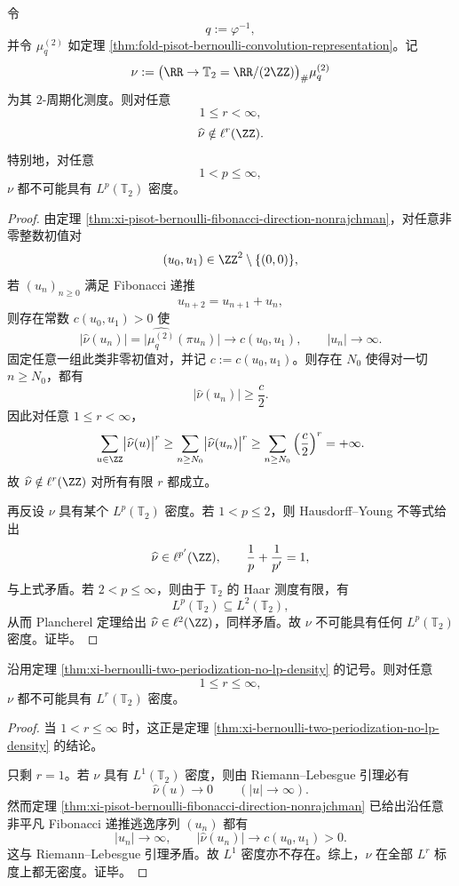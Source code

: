 \begin{theorem}\label{thm:xi-bernoulli-two-periodization-no-lp-density}
令
\[
q:=\varphi^{-1},
\]
并令 \(\mu_q^{(2)}\) 如定理 \ref{thm:fold-pisot-bernoulli-convolution-representation}。记
\[
\nu:=\bigl(\RR\to \mathbb T_2=\RR/(2\ZZ)\bigr)_\#\mu_q^{(2)}
\]
为其 \(2\)-周期化测度。则对任意
\[
1\le r<\infty,
\]
\[
\widehat\nu\notin \ell^r(\ZZ).
\]
特别地，对任意
\[
1<p\le\infty,
\]
\(\nu\) 都不可能具有 \(L^p(\mathbb T_2)\) 密度。
\end{theorem}
\begin{proof}
由定理 \ref{thm:xi-pisot-bernoulli-fibonacci-direction-nonrajchman}，对任意非零整数初值对
\[
(u_0,u_1)\in\ZZ^2\setminus\{(0,0)\},
\]
若 \((u_n)_{n\ge 0}\) 满足 Fibonacci 递推
\[
u_{n+2}=u_{n+1}+u_n,
\]
则存在常数 \(c(u_0,u_1)>0\) 使
\[
\bigl|\widehat\nu(u_n)\bigr|
=
\bigl|\widehat{\mu_q^{(2)}}(\pi u_n)\bigr|
\longrightarrow c(u_0,u_1),
\qquad
|u_n|\to\infty.
\]
固定任意一组此类非零初值对，并记 \(c:=c(u_0,u_1)\)。则存在 \(N_0\) 使得对一切 \(n\ge N_0\)，都有
\[
\bigl|\widehat\nu(u_n)\bigr|\ge \frac{c}{2}.
\]
因此对任意 \(1\le r<\infty\)，
\[
\sum_{u\in\ZZ}\bigl|\widehat\nu(u)\bigr|^r
\ge
\sum_{n\ge N_0}\bigl|\widehat\nu(u_n)\bigr|^r
\ge
\sum_{n\ge N_0}\left(\frac{c}{2}\right)^r
=+\infty.
\]
故 \(\widehat\nu\notin \ell^r(\ZZ)\) 对所有有限 \(r\) 都成立。

再反设 \(\nu\) 具有某个 \(L^p(\mathbb T_2)\) 密度。若 \(1<p\le 2\)，则 Hausdorff--Young 不等式给出
\[
\widehat\nu\in \ell^{p'}(\ZZ),
\qquad
\frac1p+\frac1{p'}=1,
\]
与上式矛盾。若 \(2<p\le\infty\)，则由于 \(\mathbb T_2\) 的 Haar 测度有限，有
\[
L^p(\mathbb T_2)\subseteq L^2(\mathbb T_2),
\]
从而 Plancherel 定理给出 \(\widehat\nu\in \ell^2(\ZZ)\)，同样矛盾。故 \(\nu\) 不可能具有任何 \(L^p(\mathbb T_2)\) 密度。证毕。
\end{proof}

\begin{theorem}\label{thm:xi-bernoulli-two-periodization-no-any-lr-density}
沿用定理 \ref{thm:xi-bernoulli-two-periodization-no-lp-density} 的记号。则对任意
\[
1\le r\le \infty,
\]
\(\nu\) 都不可能具有 \(L^r(\mathbb T_2)\) 密度。
\end{theorem}
\begin{proof}
当 \(1<r\le \infty\) 时，这正是定理 \ref{thm:xi-bernoulli-two-periodization-no-lp-density} 的结论。

只剩 \(r=1\)。若 \(\nu\) 具有 \(L^1(\mathbb T_2)\) 密度，则由 Riemann--Lebesgue 引理必有
\[
\widehat\nu(u)\longrightarrow 0
\qquad (|u|\to\infty).
\]
然而定理 \ref{thm:xi-pisot-bernoulli-fibonacci-direction-nonrajchman} 已给出沿任意非平凡 Fibonacci 递推逃逸序列 \((u_n)\) 都有
\[
|u_n|\to\infty,
\qquad
\bigl|\widehat\nu(u_n)\bigr|\longrightarrow c(u_0,u_1)>0.
\]
这与 Riemann--Lebesgue 引理矛盾。故 \(L^1\) 密度亦不存在。综上，\(\nu\) 在全部 \(L^r\) 标度上都无密度。证毕。
\end{proof}

\endinput
